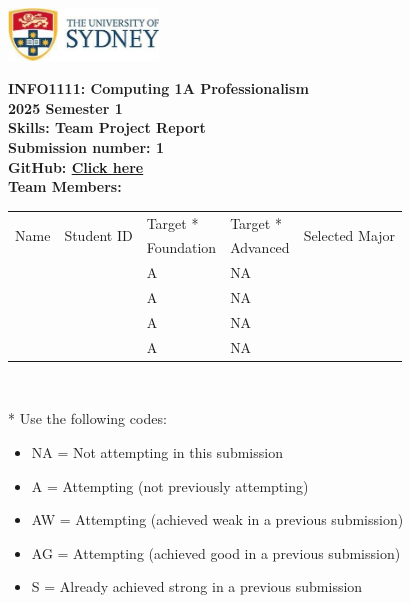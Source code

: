 \documentclass[a4paper, 11pt]{report}
\begin{document}
\begin{titlepage}
\begin{flushright}
\includegraphics[width=4cm]{USyd}\\[1cm]
\end{flushright}

\begin{centering}
\textbf{\huge INFO1111: Computing 1A Professionalism}\\[0.75cm]
\textbf{\huge 2025 Semester 1}\\[2cm]
\textbf{\huge Skills: Team Project Report}\\[2cm]

\textbf{\large Submission number: 1}\\[0.5cm]
\textbf{\large GitHub: \href{https://github.com/absrads/Computing-Professionalism-Assignment-1}{Click here}}\\[0.5cm]

\textbf{\huge Team Members:}\\[0.75cm]

\begin{tabular}{|p{}|p{}|p{}|p{}|p{}|}
	\hline
	\multirow{2}{*}{Name} & \multirow{2}{*}{Student ID} & Target * & Target * & \multirow{2}{*}{Selected Major} \\
	 & & Foundation & Advanced & \\
	\hline
	\hline
	\raggedright{\studA} & \sidA & A & NA & \majA \\
	\hline
	\raggedright{\studB} & \sidB & A & NA & \majB \\
	\hline
	\raggedright{\studC} & \sidC & A & NA & \majC \\
	\hline
	\raggedright{\studD} & \sidD & A & NA & \majD \\
	\hline
\end{tabular}
\\[0.5cm]
\end{centering}

* Use the following codes:
\begin{itemize}
\setlength\itemsep{0em}
\item NA = Not attempting in this submission
\item A = Attempting (not previously attempting)
\item AW = Attempting (achieved weak in a previous submission) 
\item AG = Attempting (achieved good in a previous submission)
\item S = Already achieved strong in a previous submission
\end{itemize}

\thispagestyle{empty}
\end{titlepage}
\end{document}
